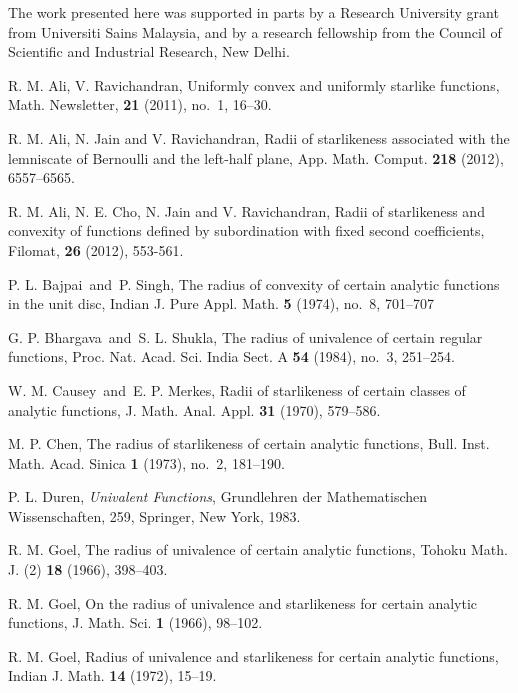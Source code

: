 \documentclass{amsart}
\begin{document}
 The work presented here was supported in parts by a Research University grant from Universiti Sains Malaysia, and by a research fellowship from the Council of Scientific and Industrial Research, New Delhi.

\begin{thebibliography}{99}

 R. M. Ali,  V. Ravichandran, Uniformly convex and uniformly starlike functions,    Math. Newsletter,   \textbf{21} (2011), no.~1, 16--30.

R. M. Ali, N. Jain and V. Ravichandran, Radii of starlikeness associated with the lemniscate  of Bernoulli and the left-half plane, App. Math. Comput. {\bf  218} (2012), 6557--6565.

 R. M. Ali, N. E. Cho, N. Jain and V. Ravichandran, Radii of starlikeness and convexity of functions defined by subordination with fixed second coefficients, Filomat,   \textbf{26} (2012), 553-561.

 P. L. Bajpai\ and\ P. Singh, The radius of convexity of certain analytic functions in the unit disc, Indian J. Pure Appl. Math. {\bf 5} (1974), no.~8, 701--707

 G. P. Bhargava\ and\ S. L. Shukla, The radius of univalence of certain regular functions, Proc. Nat. Acad. Sci. India Sect. A {\bf 54} (1984), no.~3, 251--254.

 W. M. Causey\ and\ E. P. Merkes, Radii of starlikeness of certain classes of analytic functions, J. Math. Anal. Appl. {\bf 31} (1970), 579--586.

M. P. Chen, The radius of starlikeness of certain analytic functions, Bull. Inst. Math. Acad. Sinica {\bf 1} (1973), no.~2, 181--190.

 P. L. Duren, {\it Univalent Functions}, Grundlehren der Mathematischen Wissenschaften, 259, Springer, New York, 1983.

 R. M. Goel, The radius of univalence of certain analytic functions, Tohoku Math. J. (2) {\bf 18} (1966), 398--403.

 R. M. Goel, On the radius of univalence and starlikeness for certain analytic functions, J. Math. Sci. {\bf 1} (1966), 98--102.

 R. M. Goel, Radius of univalence and starlikeness for certain analytic functions, Indian J. Math. {\bf 14} (1972), 15--19.


\end{thebibliography}
\end{document}
